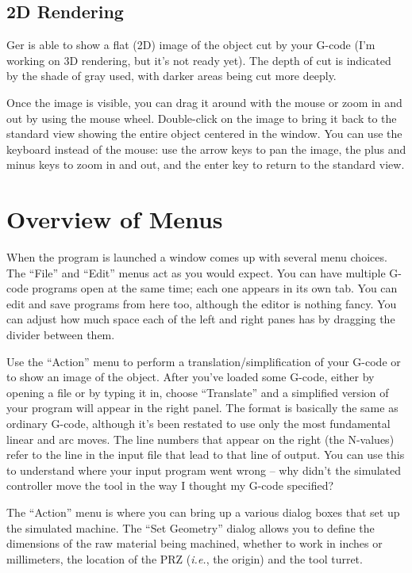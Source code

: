 \documentclass[titlepage,oneside,10pt]{article}
\begin{document}
\subsection{2D Rendering}

Ger is able to show a flat (2D) image of the object cut by your
G-code (I'm working on 3D rendering, but it's not ready
yet). The depth of cut is indicated by the shade of gray used, with
darker areas being cut more deeply. 

Once the image is visible, you can drag it around with the mouse or
zoom in and out by using the mouse wheel. Double-click on the
image to bring it back to the standard view showing the entire object
centered in the window. You can use the keyboard instead of the mouse:
use the arrow keys to pan the image, the plus and minus keys to 
zoom in and out, and the enter key to return to the standard view.

\section{Overview of Menus}

When the program is launched a window comes up with several menu
choices. The ``File'' and ``Edit'' menus act as you would expect. You
can have multiple G-code programs open at the same time; each one
appears in its own tab. You can edit and save programs from here too,
although the editor is nothing fancy. You can adjust how much space
each of the left and right panes has by dragging the divider between them.

Use the ``Action'' menu to perform a translation/simplification of
your G-code or to show an image of the object. After you've loaded
some G-code, either by opening a file or by typing it in, choose
``Translate'' and a simplified version of your program will appear in
the right panel. The format is basically the same as ordinary G-code,
although it's been restated to use only 
the most fundamental linear and arc moves. The line numbers that
appear on the right (the N-values) refer to the line in the input file
that lead to that line of output. You can use this to understand where
your input program went wrong -- why didn't the simulated controller
move the tool in the way I thought my G-code specified?

The ``Action'' menu is where you can bring up a various dialog boxes
that set up the simulated machine. The ``Set Geometry'' dialog allows
you to define the dimensions of the raw material being machined,
whether to work in inches or millimeters, the location of the PRZ
(\emph{i.e.}, the origin) and the tool turret. 
\end{document}
